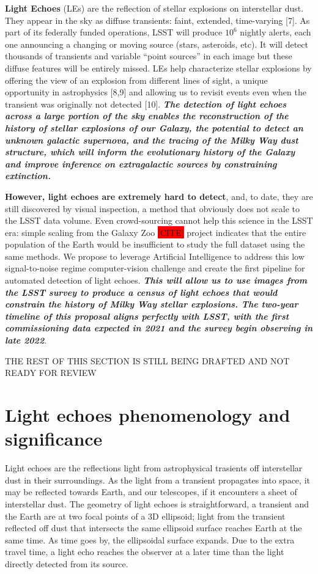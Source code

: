 \documentclass{proposalnsf}
\newcommand{\ana}[1]{\colorbox{red}{#1}}
\begin{document}
{\bf Light Echoes} (LEs) are the reflection of stellar explosions on interstellar dust. They appear in the sky as diffuse transients: faint, extended, time-varying [7]. 
As part of its federally funded operations, LSST will produce $10^6$ nightly alerts, each one announcing a changing or moving source (stars, asteroids, etc).  It will detect thousands of transients and variable “point sources” in each image but these diffuse features will be entirely missed.  LEs help characterize stellar explosions by offering the view of an explosion from different lines of sight, a unique opportunity in astrophysics [8,9] 
 and allowing us to revisit events even when the transient was originally not detected [10]. 
{\bf\emph{ The detection of light echoes across a large portion of the sky enables the reconstruction of the history of stellar explosions of our Galaxy, the potential to detect an unknown galactic supernova, and the tracing of the Milky Way dust structure, which will inform the evolutionary history of the Galaxy and improve inference on extragalactic sources by constraining extinction. }}


{\bf However, light echoes are extremely hard to detect}, and, to date, they are still discovered by visual inspection, a method that obviously does not scale to the LSST data volume.  Even crowd-sourcing cannot help this science in the LSST era: simple scaling from the Galaxy Zoo \ana{[CITE]} project indicates that the entire population of the Earth would be insufficient to study the full dataset using the same methods.  We propose to leverage Artificial Intelligence to address this low signal-to-noise regime computer-vision challenge and create the first pipeline for automated detection of light echoes.  {\bf \emph{This will allow us to use images from the LSST survey to produce a census of light echoes that would constrain the history of Milky Way stellar explosions.  The two-year timeline of this proposal aligns perfectly with LSST, with the first commissioning data expected in 2021 and the survey begin observing in late 2022}}.



{\LARGE{THE REST OF THIS SECTION  IS STILL BEING DRAFTED AND NOT READY FOR REVIEW}}


\section{Light echoes phenomenology and significance}
Light echoes are the reflections light from astrophysical trasients off interstellar dust in their surroundings.  As the light from a transient propagates into space, it may be reflected towards Earth, and our telescopes, if it encounters a sheet of interstellar dust. The geometry of light echoes is straightforward, a transient and the Earth are at two focal points of a 3D ellipsoid; light from the transient reflected off dust that intersects the same ellipsoid surface reaches Earth at the same time. As time goes by, the ellipsoidal surface expands. Due to the extra travel time, a light echo reaches the observer at a later time than the light directly detected from its source.
\end{document}
